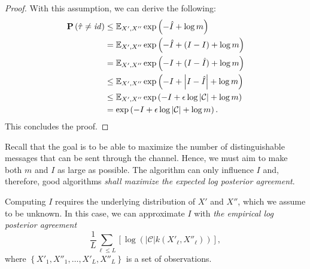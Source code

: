 \begin{proof}

With this assumption, we can derive the following:
%
\begin{align*}
\mathbf{P}\left(\hat{\tau} \neq \mathit{id}\right) &\leq \mathbb{E}_{X', X''}\exp\left(-\hat{I} + \log m\right)\\
&= \mathbb{E}_{X', X''}\exp\left(-\hat{I} + (I-I) + \log m\right)\\
&= \mathbb{E}_{X', X''}\exp\left(-I + (I - \hat{I}) + \log m\right)\\
&\leq \mathbb{E}_{X', X''}\exp\left(-I + \left|I - \hat{I}\right| + \log m\right)\\
&\leq \mathbb{E}_{X', X''}\exp\left(-I + \epsilon \log \left|\mathcal{C}\right| + \log m\right)\\
&= \exp\left(-I + \epsilon \log \left|\mathcal{C}\right| + \log m\right).
\end{align*}
%
This concludes the proof.
\end{proof}

Recall that the goal is to be able to maximize the number of distinguishable messages that can be sent through the channel. Hence, we must aim to make both $m$ and $I$ as large as possible. The algorithm can only influence $I$ and, therefore, good algorithms \emph{shall maximize the expected log posterior agreement}.

Computing $I$ requires the underlying distribution of $X'$ and $X''$, which we assume to be unknown. In this case, we can approximate $I$ with \emph{the empirical log posterior agreement}
%
\begin{equation}
\frac{1}{L}\sum_{\ell \leq L} \left[\log \left(\left|\mathcal{C}\right|k(X'_\ell, X''_\ell)\right)\right],
\label{eq:emp_log_pa}
\end{equation}
%
where $\left\{X'_1, X''_1, \ldots, X'_L, X''_L\right\}$ is a set of observations.

